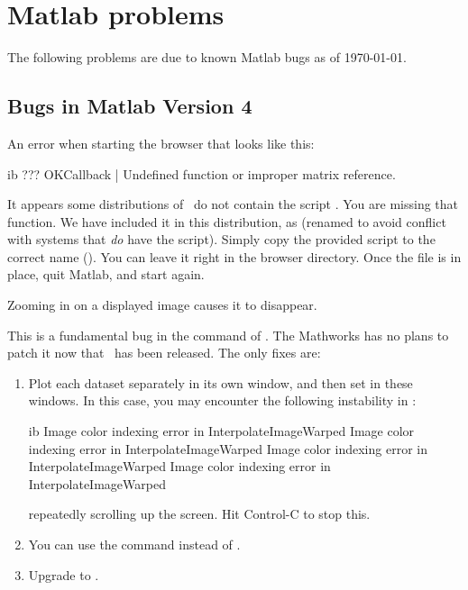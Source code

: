 

\section{Matlab problems}

The following problems are due to known Matlab bugs as of \today .

\subsection{Bugs in Matlab Version 4}

\problem An error when starting the browser that looks like this:

\begin{vcode}{ib}
???          OKCallback
             |
 Undefined function or improper matrix reference.
\end{vcode}

\fix It appears some distributions of \mfour\ do not 
contain the script .  You are missing that function.
We have included it in this distribution, as 
(renamed to avoid conflict with systems that \emph{do} have the
script).  Simply copy the provided script to the correct name (). You can leave it right in the browser directory. 
Once the file is in place, quit Matlab, and start again.

\problem Zooming in on a displayed image causes it to disappear.

\fix This is a fundamental bug in the  command 
of \mfour.  The Mathworks has no plans to patch it now that \mfive\ has
been released.  The only fixes are: 

\begin{enumerate}

\item 
Plot each dataset separately in its own window, and then set  in these windows.  In this case, you may encounter the following
instability in \mfour:

\begin{vcode}{ib}
Image color indexing error in InterpolateImageWarped
Image color indexing error in InterpolateImageWarped
Image color indexing error in InterpolateImageWarped
Image color indexing error in InterpolateImageWarped
\end{vcode}

repeatedly scrolling up the screen.  Hit Control-C to stop this.

\item
You can use the  command instead of . 

\item
Upgrade to \mfive.
\end{enumerate}

